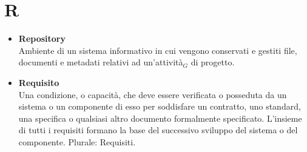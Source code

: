 \chapter{R} \label{R}
	\begin{itemize}
		\item \textbf{Repository} \\
		Ambiente di un sistema informativo in cui vengono conservati e gestiti file, documenti e metadati relativi ad un’attività$_G$ di progetto.
		
		\item \textbf{Requisito}\\
		Una condizione, o capacità, che deve essere verificata o posseduta da un sistema o un componente di esso per soddisfare un contratto, uno standard, una specifica o qualsiasi altro documento formalmente specificato. L'insieme di tutti i requisiti formano la base del successivo sviluppo del sistema o del componente.
		Plurale: Requisiti.
		
	\end{itemize}